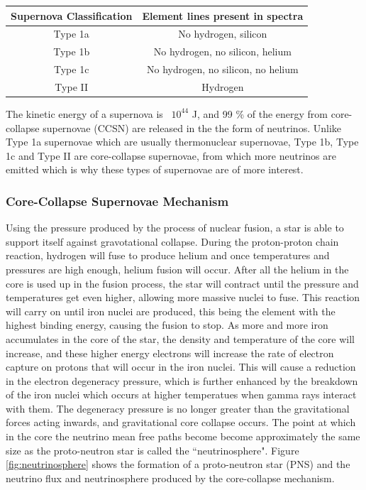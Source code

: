 \begin{center}
\begin{tabular}{||c c||} 
    \hline
    Supernova Classification & Element lines present in spectra \\ 
    \hline \hline
    Type 1a & No hydrogen, silicon  \\ 
    \hline
    Type 1b & No hydrogen, no silicon, helium  \\
    \hline
    Type 1c & No hydrogen, no silicon, no helium  \\
    \hline
    Type II & Hydrogen  \\
    \hline \hline
\end{tabular}
\label{table:supernova_classification}
\end{center}

The kinetic energy of a supernova is ~$10^{44}$ J, and 99 \% of the energy from core-collapse supernovae (CCSN) are released in the the form of neutrinos. Unlike Type 1a supernovae which are usually thermonuclear supernovae, Type 1b, Type 1c and Type II are core-collapse supernovae, from which more neutrinos are emitted which is why these types of supernovae are of more interest. 

\subsubsection{Core-Collapse Supernovae Mechanism}

Using the pressure produced by the process of nuclear fusion, a star is able to support itself against gravotational collapse. During the proton-proton chain reaction, hydrogen will fuse to produce helium and once temperatures and pressures are high enough, helium fusion will occur. After all the helium in the core is used up in the fusion process, the star will contract until the pressure and temperatures get even higher, allowing more massive nuclei to fuse. This reaction will carry on until iron nuclei are produced, this being the element with the highest binding energy, causing the fusion to stop.
\newline
As more and more iron accumulates in the core of the star, the density and temperature of the core will increase, and these higher energy electrons will increase the rate of electron capture on protons that will occur in the iron nuclei. This will cause a reduction in the electron degeneracy pressure, which is further enhanced by the breakdown of the iron nuclei which occurs at higher temperatues when gamma rays interact with them. The degeneracy pressure is no longer greater than the gravitational forces acting inwards, and gravitational core collapse occurs. 
\newline
The point at which in the core the neutrino mean free paths become become approximately the same size as the proto-neutron star is called the ``neutrinosphere".  Figure \ref{fig:neutrinosphere} shows the formation of a proto-neutron star (PNS) and the neutrino flux and neutrinosphere produced by the core-collapse mechanism. 

